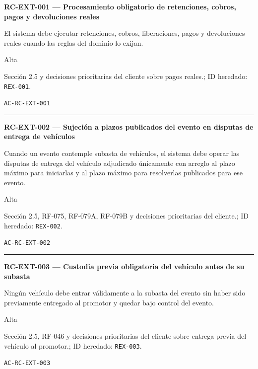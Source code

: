 \documentclass[10pt,letterpaper]{article}
\begin{document}
\noindent\textbf{RC-EXT-001 --- Procesamiento obligatorio de retenciones, cobros, pagos y devoluciones reales}\par
\begin{description}[style=nextline,leftmargin=3.15cm,labelwidth=2.8cm,font=\normalfont\bfseries]
\item[Obligación] El sistema debe ejecutar retenciones, cobros, liberaciones, pagos y devoluciones reales cuando las reglas del dominio lo exijan.
\item[Prioridad] Alta
\item[Procedencia] Sección 2.5 y decisiones prioritarias del cliente sobre pagos reales.; ID heredado: \texttt{REX-001}.
\item[Verificación] \texttt{AC-RC-EXT-001}
\end{description}
\vspace{0.25em}\hrule\vspace{0.65em}
\noindent\textbf{RC-EXT-002 --- Sujeción a plazos publicados del evento en disputas de entrega de vehículos}\par
\begin{description}[style=nextline,leftmargin=3.15cm,labelwidth=2.8cm,font=\normalfont\bfseries]
\item[Obligación] Cuando un evento contemple subasta de vehículos, el sistema debe operar las disputas de entrega del vehículo adjudicado únicamente con arreglo al plazo máximo para iniciarlas y al plazo máximo para resolverlas publicados para ese evento.
\item[Prioridad] Alta
\item[Procedencia] Sección 2.5, RF-075, RF-079A, RF-079B y decisiones prioritarias del cliente.; ID heredado: \texttt{REX-002}.
\item[Verificación] \texttt{AC-RC-EXT-002}
\end{description}
\vspace{0.25em}\hrule\vspace{0.65em}
\noindent\textbf{RC-EXT-003 --- Custodia previa obligatoria del vehículo antes de su subasta}\par
\begin{description}[style=nextline,leftmargin=3.15cm,labelwidth=2.8cm,font=\normalfont\bfseries]
\item[Obligación] Ningún vehículo debe entrar válidamente a la subasta del evento sin haber sido previamente entregado al promotor y quedar bajo control del evento.
\item[Prioridad] Alta
\item[Procedencia] Sección 2.5, RF-046 y decisiones prioritarias del cliente sobre entrega previa del vehículo al promotor.; ID heredado: \texttt{REX-003}.
\item[Verificación] \texttt{AC-RC-EXT-003}
\end{description}
\end{document}

